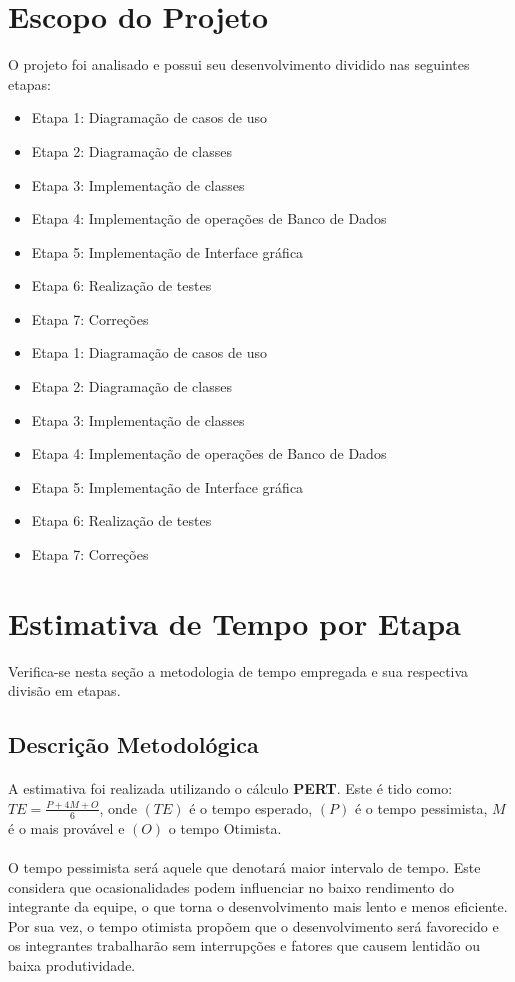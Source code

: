 \documentclass[12pt,a4paper]{article}
\begin{document}
	\section{Escopo do Projeto}
	O projeto foi analisado e possui seu desenvolvimento dividido nas seguintes etapas:
	\begin{itemize}			
		\item Etapa 1: Diagramação de casos de uso
		\item Etapa 2: Diagramação de classes
		\item Etapa 3: Implementação de classes
		\item Etapa 4: Implementação de operações de Banco de Dados
		\item Etapa 5: Implementação de Interface gráfica
		\item Etapa 6: Realização de testes
		\item Etapa 7: Correções
			\item Etapa 1: Diagramação de casos de uso
		\item Etapa 2: Diagramação de classes
		\item Etapa 3: Implementação de classes
		\item Etapa 4: Implementação de operações de Banco de Dados
		\item Etapa 5: Implementação de Interface gráfica
		\item Etapa 6: Realização de testes
		\item Etapa 7: Correções
		
	\end{itemize}
	
	\section{Estimativa de Tempo por Etapa}
	Verifica-se nesta seção a metodologia de tempo empregada e sua respectiva divisão em etapas.
		\subsection{Descrição Metodológica}
		\paragraph{} A estimativa foi realizada utilizando o cálculo \textbf{PERT}. Este é tido como:
	$TE = \frac{P + 4M + O}{6}$, onde $(TE)$ é o tempo esperado, $(P)$ é o tempo pessimista, $M$ é o mais provável e $(O)$ o tempo Otimista.
	
	\paragraph{} O tempo pessimista será aquele que denotará maior intervalo de tempo. Este considera que ocasionalidades podem influenciar no baixo rendimento do integrante da equipe, o que torna o desenvolvimento mais lento e menos eficiente. Por sua vez, o tempo otimista propõem que o desenvolvimento será favorecido e os integrantes trabalharão sem interrupções e fatores que causem lentidão ou baixa produtividade. 
	
\end{document}
